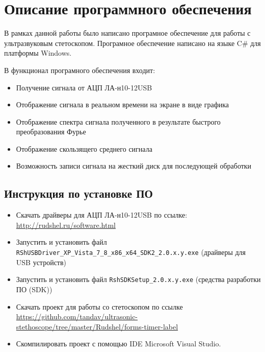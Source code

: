 \newpage
\section{Описание программного обеспечения}
В рамках данной работы было написано програмное обеспечение для работы с ультразвуковым стетоскопом. Програмное обеспечение написано на языке C\# для платформы Windows.

В функционал програмного обеспечения входит:
\begin{itemize}
  \item Получение сигнала от АЦП ЛА-н10-12USB
  \item Отображение сигнала в реальном времени на экране в виде графика
  \item Отображение спектра сигнала полученного в результате быстрого преобразования Фурье
  \item Отображение скользящего среднего сигнала
  \item Возможность записи сигнала на жесткий диск для последующей обработки
\end{itemize}

\subsection{Инструкция по установке ПО}
\begin{itemize}
  \item Скачать драйверы для АЦП ЛА-н10-12USB по ссылке:\\ \url{http://rudshel.ru/software.html}
  \item Запустить и установить файл \verb|RShUSBDriver_XP_Vista_7_8_x86_x64_SDK2_2.0.x.y.exe| (драйверы для USB устройств)
  \item Запустить и установить файл \verb|RshSDKSetup_2.0.x.y.exe| (средства разработки ПО (SDK))
  \item Скачать проект для работы со стетоскопом по ссылке \url{https://github.com/tandav/ultrasonic-stethoscope/tree/master/Rudshel/forms-timer-label}
  \item Скомпилировать проект с помощью IDE Microsoft Visual Studio.
\end{itemize}

